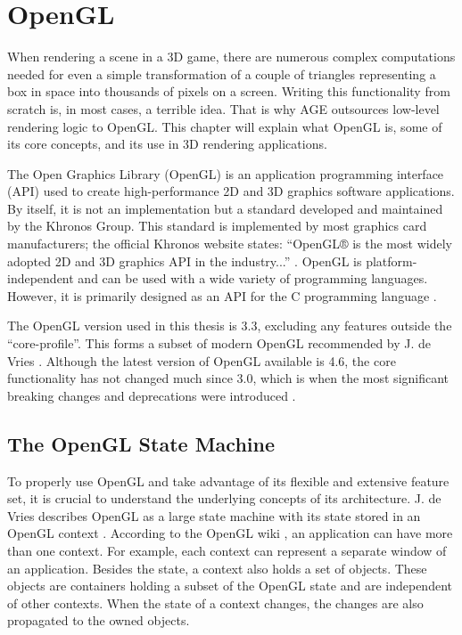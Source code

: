 \documentclass[
  digital,     %
  oneside,     %
  nosansbold,  %
  nocolorbold, %
  lof,         %
  lot,         %
]{fithesis4}
\begin{document}
\chapter{OpenGL}\label{chap:opengl}
When rendering a scene in a 3D game, there are numerous complex computations needed for even a simple transformation
of a couple of triangles representing a box in space into thousands of pixels on a screen.
Writing this functionality from scratch is, in most cases, a terrible idea. That is why AGE outsources low-level
rendering logic to OpenGL. This chapter will explain what OpenGL is, some of its core concepts,
and its use in 3D rendering applications.

The Open Graphics Library (OpenGL) is an application programming interface (API) used to create
high-performance 2D and 3D graphics software applications. By itself, it is not an implementation
but a standard developed and maintained by the Khronos Group. This standard is implemented by
most graphics card manufacturers; the official Khronos website states: \enquote{OpenGL® is the most widely
adopted 2D and 3D graphics API in the industry...} \cite{khronos}. OpenGL is platform-independent and can be
used with a wide variety of programming languages. However, it is primarily designed as an API for
the C programming language \cite{khronos}\cite{learnopengl}.

The OpenGL version used in this thesis is 3.3, excluding any features outside the \enquote{core-profile}.
This forms a subset of modern OpenGL recommended by J. de Vries \cite{learnopengl}.
Although the latest version of OpenGL available is 4.6, the core functionality has not changed
much since 3.0, which is when the most significant breaking changes and deprecations
were introduced \cite{openglwiki-context}.

\section{The OpenGL State Machine}
To properly use OpenGL and take advantage of its flexible and extensive feature set, it is crucial to
understand the underlying concepts of its architecture. J. de Vries describes OpenGL as a large state
machine with its state stored in an OpenGL context \cite{learnopengl}. According to the OpenGL wiki \cite{openglwiki-context},
an application can have more than one context. For example, each context can represent a separate window of an
application. Besides the state, a context also holds a set of objects. These objects are containers
holding a subset of the OpenGL state and are independent of other contexts. When the state of
a context changes, the changes are also propagated to the owned objects.
\end{document}

